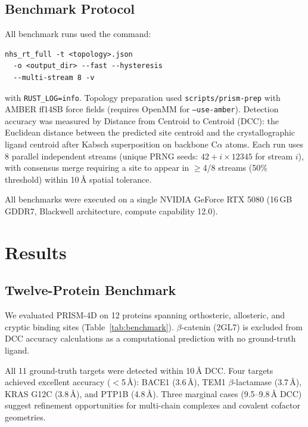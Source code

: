 \documentclass[11pt,twocolumn]{article}
\begin{document}
\subsection{Benchmark Protocol}

All benchmark runs used the command:
\begin{verbatim}
nhs_rt_full -t <topology>.json
  -o <output_dir> --fast --hysteresis
  --multi-stream 8 -v
\end{verbatim}
with \texttt{RUST\_LOG=info}. Topology preparation used \texttt{scripts/prism-prep} with
AMBER ff14SB force fields (requires OpenMM for \texttt{--use-amber}). Detection accuracy was
measured by Distance from Centroid to Centroid (DCC): the Euclidean distance between the
predicted site centroid and the crystallographic ligand centroid after Kabsch superposition
on backbone C$\alpha$ atoms. Each run uses 8 parallel independent streams (unique PRNG seeds:
$42 + i \times 12345$ for stream $i$), with consensus merge requiring a site to appear in
$\geq$4/8 streams (50\% threshold) within 10\,\AA{} spatial tolerance.

All benchmarks were executed on a single NVIDIA GeForce RTX 5080 (16\,GB GDDR7, Blackwell
architecture, compute capability 12.0).

\section{Results}

\subsection{Twelve-Protein Benchmark}

We evaluated PRISM-4D on 12 proteins spanning orthosteric, allosteric, and cryptic binding
sites (Table~\ref{tab:benchmark}). $\beta$-catenin (2GL7) is excluded from DCC accuracy
calculations as a computational prediction with no ground-truth ligand.


All 11 ground-truth targets were detected within 10\,\AA{} DCC. Four targets achieved
excellent accuracy ($<$5\,\AA{}): BACE1 (3.6\,\AA{}), TEM1 $\beta$-lactamase (3.7\,\AA{}),
KRAS G12C (3.8\,\AA{}), and PTP1B (4.8\,\AA{}). Three marginal cases (9.5--9.8\,\AA{} DCC)
suggest refinement opportunities for multi-chain complexes and covalent cofactor geometries.
\end{document}
